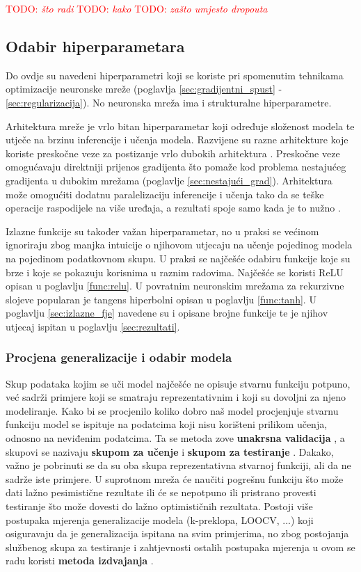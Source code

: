 \documentclass[times, utf8, numeric, diplomski]{fer}
\def\TODO#1{\noindent\textcolor{red}{TODO: \textit{#1}}\newline}
\def\todo#1{\TODO{#1}}
\begin{document}
\todo{što radi}
\todo{kako}
\todo{zašto umjesto dropouta}

\subsection{Odabir hiperparametara}
Do ovdje su navedeni hiperparametri koji se koriste pri spomenutim tehnikama optimizacije neuronske mreže (poglavlja \ref{sec:gradijentni_spust} - \ref{sec:regularizacija}). No neuronska mreža ima i strukturalne hiperparametre.

Arhitektura mreže je vrlo bitan hiperparametar koji određuje složenost modela te utječe na brzinu inferencije i učenja modela. Razvijene su razne arhitekture koje koriste preskočne veze za postizanje vrlo dubokih arhitektura \citep{resnet, densenet}. Preskočne veze omogućavaju direktniji prijenos gradijenta što pomaže kod problema nestajućeg gradijenta u dubokim mrežama (poglavlje \ref{sec:nestajući_grad}). Arhitektura može omogućiti dodatnu paralelizaciju inferencije i učenja tako da se teške operacije raspodijele na više uređaja, a rezultati spoje samo kada je to nužno \citep{alexnet}.

Izlazne funkcije su također važan hiperparametar, no u praksi se većinom ignoriraju zbog manjka intuicije o njihovom utjecaju na učenje pojedinog modela na pojedinom podatkovnom skupu. U praksi se najčešće odabiru funkcije koje su brze i koje se pokazuju korisnima u raznim radovima. Najčešće se koristi ReLU opisan u poglavlju \ref{func:relu}. U povratnim neuronskim mrežama za rekurzivne slojeve popularan je tangens hiperbolni opisan u poglavlju \ref{func:tanh}. U poglavlju \ref{sec:izlazne_fje} navedene su i opisane brojne funkcije te je njihov utjecaj ispitan u poglavlju \ref{sec:rezultati}.

\subsubsection{Procjena generalizacije i odabir modela}
\label{sec:crossval}
Skup podataka kojim se uči model najčešće ne opisuje stvarnu funkciju potpuno, već sadrži primjere koji se smatraju reprezentativnim i koji su dovoljni za njeno modeliranje. Kako bi se procjenilo koliko dobro naš model procjenjuje stvarnu funkciju model se ispituje na podatcima koji nisu korišteni prilikom učenja, odnosno na neviđenim podatcima. Ta se metoda zove \textbf{unakrsna validacija} , a skupovi se nazivaju \textbf{skupom za učenje}  i \textbf{skupom za testiranje} . Dakako, važno je pobrinuti se da su oba skupa reprezentativna stvarnoj funkciji, ali da ne sadrže iste primjere. U suprotnom mreža će naučiti pogrešnu funkciju što može dati lažno pesimistične rezultate ili će se nepotpuno ili pristrano provesti testiranje što može dovesti do lažno optimističnih rezultata. Postoji više postupaka mjerenja generalizacije modela (k-preklopa, LOOCV, ...) koji osiguravaju da je generalizacija ispitana na svim primjerima, no zbog postojanja službenog skupa za testiranje i zahtjevnosti ostalih postupaka mjerenja u ovom se radu koristi \textbf{metoda izdvajanja} .
\end{document}
